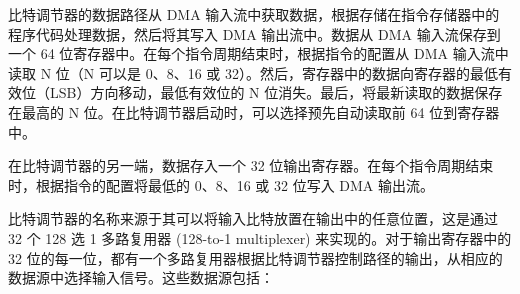 \documentclass[main\_\_CN.tex]{subfiles}
\begin{document}
比特调节器的数据路径从 DMA 输入流中获取数据，根据存储在指令存储器中的程序代码处理数据，然后将其写入 DMA 输出流中。数据从 DMA 输入流保存到一个 64 位寄存器中。在每个指令周期结束时，根据指令的配置从 DMA 输入流中读取 N 位（N 可以是 0、8、16 或 32）。然后，寄存器中的数据向寄存器的最低有效位（LSB）方向移动，最低有效位的 N 位消失。最后，将最新读取的数据保存在最高的 N 位。在比特调节器启动时，可以选择预先自动读取前 64 位到寄存器中。

在比特调节器的另一端，数据存入一个 32 位输出寄存器。在每个指令周期结束时，根据指令的配置将最低的 0、8、16 或 32 位写入 DMA 输出流。

比特调节器的名称来源于其可以将输入比特放置在输出中的任意位置，这是通过 32 个 128 选 1 多路复用器 (128-to-1 multiplexer) 来实现的。对于输出寄存器中的 32 位的每一位，都有一个多路复用器根据比特调节器控制路径的输出，从相应的数据源中选择输入信号。这些数据源包括：
\end{document}
